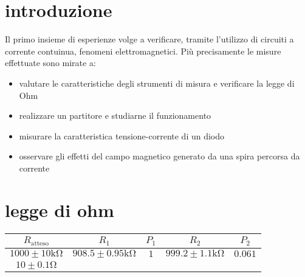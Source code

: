 \documentclass[a4paper]{article}
\begin{document}
\section{introduzione}
Il primo insieme di esperienze volge a verificare, tramite l'utilizzo di circuiti a
corrente contuinua, fenomeni elettromagnetici. Più precisamente le misure effettuate sono mirate a:
\begin{itemize}
	\item valutare le caratteristiche degli strumenti di misura e verificare la legge di Ohm
	\item realizzare un partitore e studiarne il funzionamento
	\item misurare la caratteristica tensione-corrente di un diodo
	\item osservare gli effetti del campo magnetico generato da una spira percorsa da corrente

\end{itemize}
\section{legge di ohm}


\centering
\begin{tabular}{|c|c|c|c|c|}
	\hline
	$R_{\text{atteso}}$            & $R_1$                           & $P_1$ & $R_2$ & $P_2$ \\
	\hline
	$1000 \pm 10 \si{\kilo\ohm}$   & $908.5 \pm 0.95 \si{\kilo\ohm}$ & $1$   &
	$999.2 \pm 1.1 \si{\kilo\ohm}$ & $0.061$                                                 \\
    \hline
	$10 \pm 0.1 \si{\ohm}$          &                                 &       &       &       \\
	\hline
\end{tabular}
\label{tab:Verfica legge di Ohm}






\subsection{}
\end{document}
